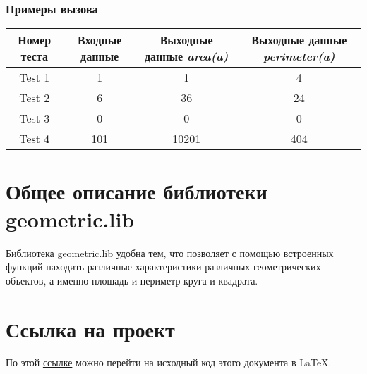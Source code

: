 \documentclass[14pt, a4paper]{article}
\begin{document}
\subsubsection*{\textbf{Примеры вызова}}

\begin{center}
    \begin{tabular}{| c | c | c | c |}
        \hline
        Номер теста & Входные данные & Выходные данные \textit{area(a)} & Выходные данные \textit{perimeter(a)}\\
        \hline
        Test 1 & 1 & 1 & 4 \\
        \hline
        Test 2 & 6 & 36 & 24 \\
        \hline
        Test 3 & 0 & 0 & 0 \\
        \hline
        Test 4 & 101 & 10201 & 404 \\
        \hline
    \end{tabular}
\end{center}

\section{Общее описание библиотеки geometric.lib}

Библиотека \href{https://github.com/smartiqaorg/geometric_lib}{geometric.lib} удобна тем, что позволяет с помощью встроенных функций находить различные характеристики различных геометрических объектов, а именно площадь и периметр круга и квадрата.

\section{Ссылка на проект}

По этой \href{https://www.overleaf.com/project/6712964861e094df5bfb0c56}{ссылке} можно перейти на исходный код этого документа в LaTeX.
\end{document}
